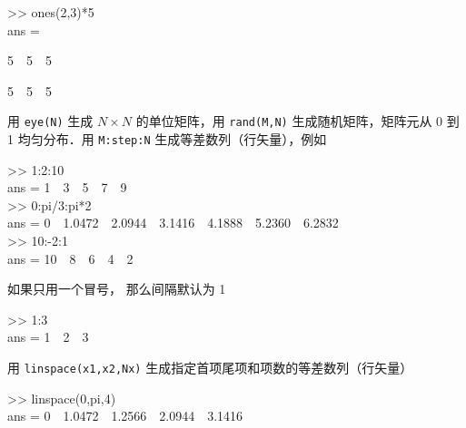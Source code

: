 \begin{Command}
>> ones(2,3)*5 \\
ans = \par
5\ \ 5\ \ 5 \par
5\ \ 5\ \ 5
\end{Command}
用 \texttt{eye(N)} 生成 $N\times N$ 的单位矩阵，用 \texttt{rand(M,N)} 生成随机矩阵，矩阵元从 0 到 1 均匀分布．用 \texttt{M:step:N} 生成等差数列（行矢量），例如
\begin{Command}
>> 1:2:10 \\
ans = 1\ \ 3\ \ 5\ \ 7\ \ 9 \\
>> 0:pi/3:pi*2 \\
ans = 0\ \ 1.0472\ \ 2.0944\ \ 3.1416\ \ 4.1888\ \ 5.2360\ \ 6.2832 \\
>> 10:-2:1 \\
ans = 10\ \ 8\ \ 6\ \ 4\ \ 2
\end{Command}
如果只用一个冒号， 那么间隔默认为 1
\begin{Command}
>> 1:3 \\
ans = 1\ \ 2\ \ 3
\end{Command}
用 \texttt{linspace(x1,x2,Nx)} 生成指定首项尾项和项数的等差数列（行矢量）
\begin{Command}
>> linspace(0,pi,4) \\
ans = 0\ \ 1.0472\ \ 1.2566\ \ 2.0944\ \ 3.1416
\end{Command}

